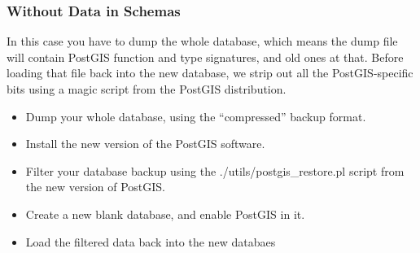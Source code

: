 \documentclass[a4paper,11pt,english]{sphinxmanual}
\begin{document}
\subsubsection{Without Data in Schemas}
\label{\detokenize{maintenance:without-data-in-schemas}}
In this case you have to dump the whole database, which means the dump file will contain PostGIS function and type signatures, and old ones at that. Before loading that file back into the new database, we strip out all the PostGIS-specific bits using a magic script from the PostGIS distribution.
\begin{itemize}
\item {} 
Dump your whole database, using the “compressed” backup format.

\begin{sphinxVerbatim}[commandchars=\\\{\}]
    
\end{sphinxVerbatim}

\item {} 
Install the new version of the PostGIS software.

\item {} 
Filter your database backup using the ./utils/postgis\_restore.pl script from the new version of PostGIS.

\begin{sphinxVerbatim}[commandchars=\\\{\}]
   
\end{sphinxVerbatim}

\item {} 
Create a new blank database, and enable PostGIS in it.

\begin{sphinxVerbatim}[commandchars=\\\{\}]
  
\end{sphinxVerbatim}

\item {} 
Load the filtered data back into the new databaes

\begin{sphinxVerbatim}[commandchars=\\\{\}]
\end{sphinxVerbatim}

\end{itemize}
\end{document}
